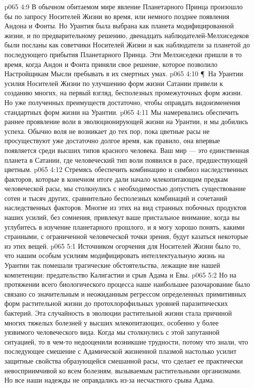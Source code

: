 \vs p065 4:9 В обычном обитаемом мире явление Планетарного Принца произошло бы по запросу Носителей Жизни во время, или немного позднее появления Андона и Фонты. Но Урантия была выбрана как планета модифицированной жизни, и по предварительному решению, двенадцать наблюдателей\hyp{}Мелхиседеков были посланы как советчики Носителей Жизни и как наблюдатели за планетой до последующего прибытия Планетарного Принца. Эти Мелхиседеки пришли в то время, когда Андон и Фонта приняли свое решение, которое позволило Настройщикам Мысли пребывать в их смертных умах.
\vs p065 4:10 \P\ На Урантии усилия Носителей Жизни по улучшению форм жизни Сатании привели к созданию многих, на первый взгляд, бесполезных промежуточных форм жизни. Но уже полученных преимуществ достаточно, чтобы оправдать видоизменения стандартных форм жизни на Урантии.
\vs p065 4:11 Мы намеревались обеспечить раннее проявление воли в эволюционирующей жизни на Урантии, и мы добились успеха. Обычно воля не возникает до тех пор, пока цветные расы не просуществуют уже достаточно долгое время, как правило, она впервые появляется среди высших типов красного человека. Ваш мир --- это единственная планета в Сатании, где человеческий тип воли появился в расе, предшествующей цветным.
\vs p065 4:12 Стремясь обеспечить комбинацию и симбиоз наследственных факторов, которые в конечном итоге дали начало млекопитающим предкам человеческой расы, мы столкнулись с необходимостью допустить существование сотен и тысяч других, сравнительно бесполезных комбинаций и сочетаний наследственных факторов. Многие из этих на вид странных побочных продуктов наших усилий, без сомнения, привлекут ваше пристальное внимание, когда вы углубитесь в изучение планетарного прошлого, и я могу хорошо понять, какими странными, с ограниченной человеческой точки зрения, будут казаться некоторые из этих вещей.
\vs p065 5:1 Источником огорчения для Носителей Жизни было то, что нашим особым усилиям модифицировать интеллектуальную жизнь на Урантии так помешали трагические обстоятельства, лежащие вне нашей компетенции: предательство Калигастии и срыв Адама и Евы.
\vs p065 5:2 Но на протяжении всего биологического процесса наше наибольшее разочарование было связано со значительным и неожиданным регрессом определенных примитивных форм растительной жизни до протохлорофильных уровней паразитических бактерий. Эта случайность в эволюции растительной жизни стала причиной многих тяжелых болезней у высших млекопитающих, особенно у более уязвимого человеческого вида. Когда мы столкнулись с этой запутанной ситуацией, то в чем\hyp{}то недооценили возникшие трудности, потому что знали, что последующее смешение с Адамической жизненной плазмой настолько усилит защитные свойства образующейся смешанной расы, что сделает ее практически невосприимчивой ко всем болезням, вызываемым растительными организмами. Но все наши надежды не оправдались из\hyp{}за несчастного срыва Адама.
